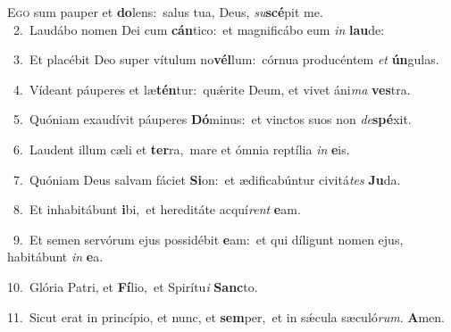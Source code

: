 \lettrine{\initial\textcolor{\initialcolor}{E}}{go} sum pauper et \textbf{do}\-lens:~\star salus tua, Deus, \textit{su}\-\textbf{scé}pit me.\\
{\numbfont\textcolor{\numbcolor}{~2.}}~Laudábo nomen Dei cum \textbf{cán}\-tico:~\star et magnificábo eum \textit{in} \textbf{lau}\-de:\par
{\numbfont\textcolor{\numbcolor}{~3.}}~Et placébit Deo super vítulum no\-\textbf{vél}\-lum:~\star córnua producéntem \textit{et} \textbf{ún}\-gulas.\par
{\numbfont\textcolor{\numbcolor}{~4.}}~Vídeant páuperes et læ\-\textbf{tén}\-tur:~\star quǽrite Deum, et vivet áni\textit{ma} \textbf{ves}\-tra.\par
{\numbfont\textcolor{\numbcolor}{~5.}}~Quóniam exaudívit páuperes \textbf{Dó}\-minus:~\star et vinctos suos non \textit{de}\-\textbf{spé}xit.\par
{\numbfont\textcolor{\numbcolor}{~6.}}~Laudent illum cæli et \textbf{ter}\-ra,~\star mare et ómnia reptília \textit{in} \textbf{e}\-is.\par
{\numbfont\textcolor{\numbcolor}{~7.}}~Quóniam Deus salvam fáciet \textbf{Si}\-on:~\star et ædificabúntur civitá\textit{tes} \textbf{Ju}\-da.\par
{\numbfont\textcolor{\numbcolor}{~8.}}~Et inhabitábunt \textbf{i}\-bi,~\star et hereditáte acquí\textit{rent} \textbf{e}\-am.\par
{\numbfont\textcolor{\numbcolor}{~9.}}~Et semen servórum ejus possidébit \textbf{e}\-am:~\star et qui díligunt nomen ejus, habitábunt \textit{in} \textbf{e}\-a.\par
{\numbfont\textcolor{\numbcolor}{10.}}~Glória Patri, et \textbf{Fí}\-lio,~\star et Spirítu\textit{i} \textbf{Sanc}\-to.\par
{\numbfont\textcolor{\numbcolor}{11.}}~Sicut erat in princípio, et nunc, et \textbf{sem}\-per,~\star et in sǽcula sæculó\-\textit{rum}\-. \textbf{A}\-men.\par
